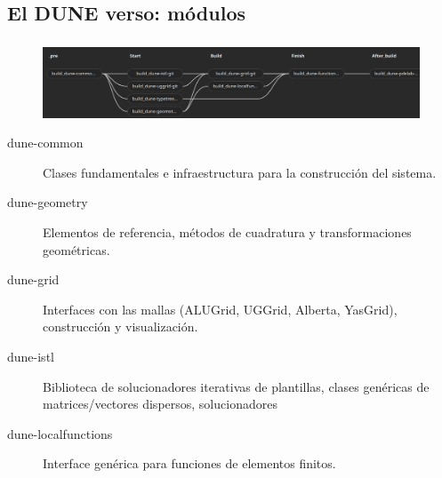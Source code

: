 \subsection{El DUNE verso: módulos}
\begin{frame}
	\frametitle{\secname}
	\framesubtitle{\subsecname}

	\begin{figure}[ht!]
		\centering
		\includegraphics[width=14.5cm]{dependences}
	\end{figure}

	\begin{description}
		\item[dune-common]

		Clases fundamentales e infraestructura para la construcción del sistema.


		\item[dune-geometry] Elementos de referencia, métodos de cuadratura y transformaciones geométricas.

		\item[dune-grid] Interfaces con las mallas (ALUGrid, UGGrid, Alberta, YasGrid), construcción y visualización.

		\item[dune-istl] Biblioteca de solucionadores iterativas de plantillas, clases genéricas de matrices/vectores dispersos, solucionadores

		\item[dune-localfunctions] Interface genérica para funciones de elementos finitos.
	\end{description}
\end{frame}

